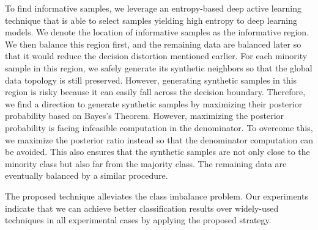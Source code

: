 \documentclass[journal]{IEEEtai}
\begin{document}
To find informative samples, we leverage an entropy-based deep active learning technique that is able to select samples yielding high entropy to deep learning models. We denote the location of informative samples as the informative region. We then balance this region first, and the remaining data are balanced later so that it would reduce the decision distortion mentioned earlier. For each minority sample in this region, we safely generate its synthetic neighbors so that the global data topology is still preserved. However, generating synthetic samples in this region is risky because it can easily fall across the decision boundary. Therefore, we find a direction to generate synthetic samples by maximizing their posterior probability based on Bayes's Theorem. However, maximizing the posterior probability is facing infeasible computation in the denominator. To overcome this, we maximize the posterior ratio instead so that the denominator computation can be avoided. This also ensures that the synthetic samples are not only close to the minority class but also far from the majority class. The remaining data are eventually balanced by a similar procedure. 

The proposed technique alleviates the class imbalance problem. Our experiments indicate that we can achieve better classification results over widely-used techniques in all experimental cases by applying the proposed strategy.  
\end{document}
